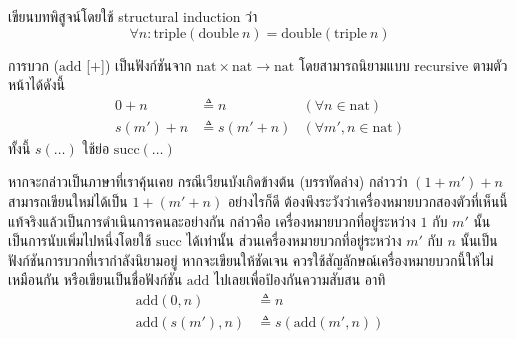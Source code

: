 \begin{exercise}
    เขียนบทพิสูจน์โดยใช้ structural induction ว่า \[\forall n:\mathrm{triple}(\mathrm{double}\ n)=\mathrm{double}(\mathrm{triple}\ n)\]
\end{exercise}

\begin{definition}
การบวก ($\mathrm{add}$ [$+$]) เป็นฟังก์ชันจาก $\mathrm{nat}\times\mathrm{nat}\to\mathrm{nat}$ โดยสามารถนิยามแบบ recursive ตามตัวหน้าได้ดังนี้
\begin{align*}
0+n &\triangleq n & (\forall n\in\mathrm{nat}) \\
s(m')+n &\triangleq s(m'+n) & (\forall m',n\in\mathrm{nat})
\end{align*}
ทั้งนี้ $s(\ldots)$ ใช้ย่อ $\mathrm{succ}(\ldots)$
\end{definition}
หากจะกล่าวเป็นภาษาที่เราคุ้นเคย กรณีเวียนบังเกิดข้างต้น (บรรทัดล่าง) กล่าวว่า $(1+m')+n$ สามารถเขียนใหม่ได้เป็น $1+(m'+n)$ \enskip อย่างไรก็ดี ต้องพึงระวังว่าเครื่องหมายบวกสองตัวที่เห็นนี้ แท้จริงแล้วเป็นการดำเนินการคนละอย่างกัน กล่าวคือ เครื่องหมายบวกที่อยู่ระหว่าง $1$ กับ $m'$ นั้นเป็นการนับเพิ่มไปหนึ่งโดยใช้ $\mathrm{succ}$ ได้เท่านั้น ส่วนเครื่องหมายบวกที่อยู่ระหว่าง $m'$ กับ $n$ นั้นเป็นฟังก์ชันการบวกที่เรากำลังนิยามอยู่ \enskip หากจะเขียนให้ชัดเจน ควรใช้สัญลักษณ์เครื่องหมายบวกนี้ให้ไม่เหมือนกัน หรือเขียนเป็นชื่อฟังก์ชัน $\mathrm{add}$ ไปเลยเพื่อป้องกันความสับสน อาทิ
\begin{align*}
\mathrm{add}(0, n) &\triangleq n \\
\mathrm{add}(s(m'), n) &\triangleq s(\mathrm{add}(m', n))
\end{align*}

